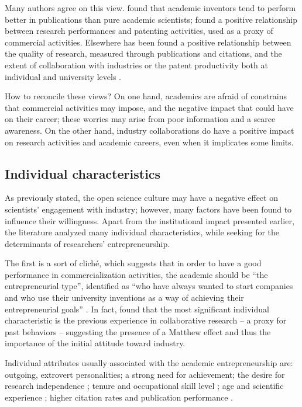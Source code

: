 Many authors agree on this view. \citet{Meyer2006} found that academic inventors tend to perform better in publications than pure academic scientists; \citet{Wong2010} found a positive relationship between research performances and patenting activities, used as a proxy of commercial activities. Elsewhere has been found a positive relationship between the quality of research, measured through publications and citations, and the extent of collaboration with industries \citep{AzagraCaro2010} or the patent productivity both at individual and university levels \citep{Baldini2007}.

How to reconcile these views? On one hand, academics are afraid of constrains that commercial activities may impose, and the negative impact that could have on their career; these worries may arise from poor information and a scarce awareness. On the other hand, industry collaborations do have a positive impact on research activities and academic careers, even when it implicates some limits.

\subsection{Individual characteristics}

As previously stated, the open science culture may have a negative effect on scientists' engagement with industry; however, many factors have been found to influence their willingness. Apart from the institutional impact presented earlier, the literature analyzed many individual characteristics, while seeking for the determinants of researchers' entrepreneurship.

The first is a sort of cliché, which suggests that in order to have a good performance in commercialization activities, the academic should be \enquote{the entrepreneurial type}, identified as \enquote{who have always wanted to start companies and who use their university inventions as a way of achieving their entrepreneurial goals} \citep{Fini2009}. In fact, \citet{DEste2007} found that the most significant individual characteristic is the previous experience in collaborative research – a proxy for past behaviors – suggesting the presence of a Matthew effect and thus the importance of the initial attitude toward industry.

Individual attributes usually associated with the academic entrepreneurship are: outgoing, extrovert personalities; a strong need for achievement; the desire for research independence \citep{OShea2004}; tenure and occupational skill level \citep{Roberts1991}; age and scientific experience \citep{Audretsch2000}; higher citation rates and publication performance \citep{Zucker2001}.

